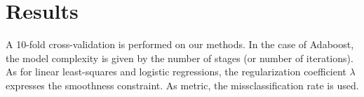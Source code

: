 \documentclass[10pt,conference,compsocconf]{IEEEtran}
\begin{document}
\section{Results}
\label{sec:orgheadline11}
A 10-fold cross-validation is performed on our methods. In the case of Adaboost, the model complexity is given by the number of stages (or number of iterations). As for linear least-squares and logistic regressions, the regularization coefficient \(\lambda\) expresses the smoothness constraint.
As metric, the missclassification rate is used.



\printbibliography
\end{document}
